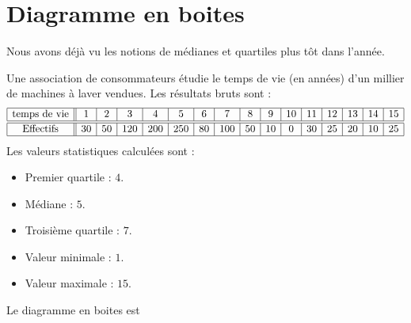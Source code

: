 

\section{Diagramme en boites}

Nous avons déjà vu les notions de médianes et quartiles plus tôt dans l'année.

\begin{example}
    Une association de consommateurs étudie le temps de vie (en années) d'un millier de machines à laver vendues. Les résultats bruts sont :
    \begin{equation*}
        \begin{array}[]{|c||c|c|c|c|c|c|c|c|c|c|c|c|c|c|c|}
            \hline
            \text{temps de vie}&1&2&3&4&5&6&7&8&9&10&11&12&13&14&15\\
            \hline\hline
            \text{Effectifs}&30&50&120&200&250&80&100&50&10&0&30&25&20&10&25\\
            \hline
        \end{array}
    \end{equation*}
    Les valeurs statistiques calculées sont :
    \begin{multicols}{2}
        \begin{itemize}
            \item
                Premier quartile : $4$.
            \item
                Médiane : \( 5\).
            \item
                Troisième quartile : \( 7\).
            \item
                Valeur minimale : \( 1\).
            \item 
                Valeur maximale : \( 15\).
        \end{itemize}
    \end{multicols}

    Le diagramme en boites est

\begin{center}

\end{center}


\end{example}
